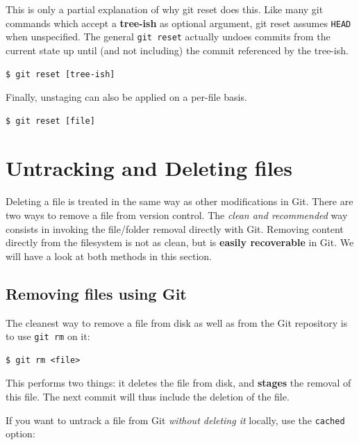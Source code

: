 \documentclass[a4paper]{../../common/tufte-latex/tufte-handout}
\begin{document}
This is only a partial explanation of why git reset does this.
Like many git commands which accept a \textbf{tree-ish} as optional argument, git reset assumes \texttt{HEAD} when unspecified.
The general \texttt{git reset} actually undoes commits from the current state up until (and not including) the commit referenced by the tree-ish. 

\begin{lstlisting}[style=BashInputStyle]
  $ git reset [tree-ish]
\end{lstlisting}

Finally, unstaging can also be applied on a per-file basis.

\begin{lstlisting}[style=BashInputStyle]
  $ git reset [file]
\end{lstlisting}

\section{Untracking and Deleting files}

Deleting a file is treated in the same way as other modifications in Git.
There are two ways to remove a file from version control.
The \textit{clean and recommended} way consists in invoking the file/folder removal directly with Git.
Removing content directly from the filesystem is not as clean, but is \textbf{easily recoverable} in Git.
We will have a look at both methods in this section.

\subsection{Removing files using Git}

The cleanest way to remove a file from disk as well as from the Git repository is to use \texttt{git rm} on it:

\begin{lstlisting}[style=BashInputStyle]
  $ git rm <file>
\end{lstlisting}

This performs two things: it deletes the file from disk, and \textbf{stages} the removal of this file.
The next commit will thus include the deletion of the file.

If you want to untrack a file from Git \textit{without deleting it} locally, use the \texttt{cached} option:
\end{document}
